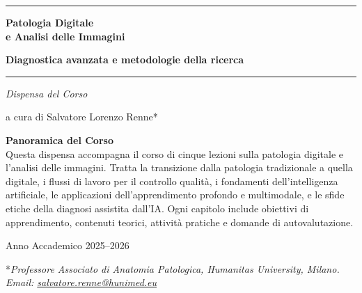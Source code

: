 \documentclass[12pt, a4paper, twoside]{book}
\begin{document}
\begin{titlepage}
  \centering
  \vspace*{2cm}

  {\color{pathblue}\rule{\linewidth}{1.5pt}}
  \vspace{0.5cm}

  {\Huge\bfseries\color{pathblue}
    Patologia Digitale\\[0.3em]
    e Analisi delle Immagini}

  \vspace{0.4cm}
  {\LARGE\bfseries\color{pathblue!70!black}
    Diagnostica avanzata e metodologie della ricerca}

  \vspace{0.3cm}
  {\color{pathblue}\rule{\linewidth}{1.5pt}}

  \vspace{1.5cm}

  {\Large\itshape Dispensa del Corso}

  \vspace{0.5cm}
  {\large a cura di Salvatore Lorenzo Renne*}

  \vfill

  \begin{tcolorbox}[colback=pathgray, colframe=pathblue, width=0.85\linewidth]
    \centering
    \textbf{Panoramica del Corso}\\[0.5em]
    \small
    Questa dispensa accompagna il corso di cinque lezioni sulla patologia digitale e
    l'analisi delle immagini. Tratta la transizione dalla patologia tradizionale a quella
    digitale, i flussi di lavoro per il controllo qualità, i fondamenti dell'intelligenza
    artificiale, le applicazioni dell'apprendimento profondo e multimodale, e le sfide
    etiche della diagnosi assistita dall'IA. Ogni capitolo include obiettivi di
    apprendimento, contenuti teorici, attività pratiche e domande di autovalutazione.
  \end{tcolorbox}

  \vspace{1.5cm}

  {\large Anno Accademico 2025--2026}

  \vspace{0.5cm}
  {\small\color{gray}
    *\textit{Professore Associato di Anatomia Patologica, Humanitas University, Milano. \\
    Email: \href{mailto:salvatore.renne@hunimed.eu}{salvatore.renne@hunimed.eu}}}

\end{titlepage}
\end{document}
